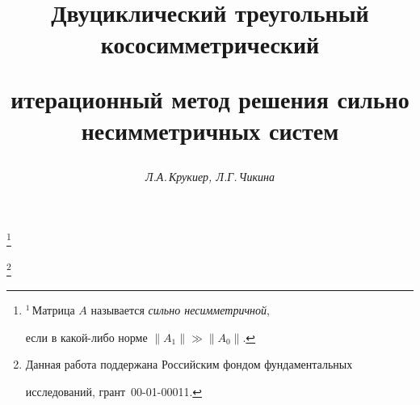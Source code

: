 

 




 


\newcommand{\Pe}{\operatorname{Pe}} 


\newcommand{\tts}[1]{} 


\renewcommand{\baselinestretch}{0.96}


 




\setcounter{page}{36} 












 


\author{\it Л.А.\,Крукиер, Л.Г.\,Чикина} 




\title{Двуциклический треугольный кососимметрический  


итерационный метод решения сильно несимметричных систем} 


\thanks{$^1$\,Матрица $A$ называется {\it сильно несимметричной}, 


если в какой-либо норме $\|A_1\|\gg\|A_0\|$.}


\thanks{Данная работа поддержана Российским фондом фундаментальных 


исследований, грант \No\,00-01-00011.} 


 


\date{} 




\pagestyle{plain} %


